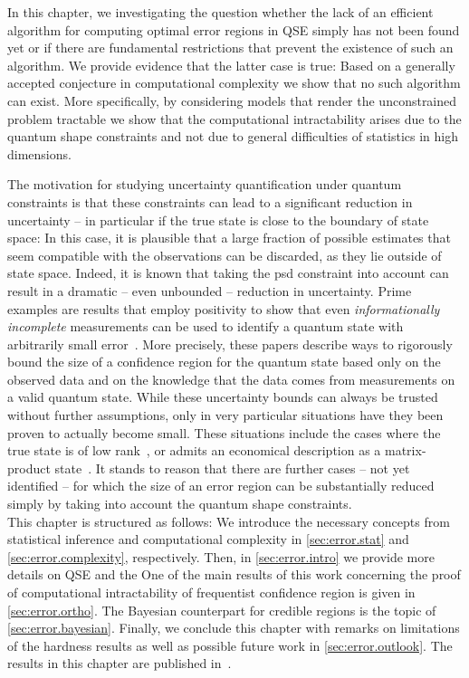 In this chapter, we investigating the question whether the lack of an efficient algorithm for computing optimal error regions in QSE simply has not been found yet or if there are fundamental restrictions that prevent the existence of such an algorithm.
We provide evidence that the latter case is true:
Based on a generally accepted conjecture in computational complexity we show that no such algorithm can exist.
More specifically, by considering models that render the unconstrained problem tractable we show that the computational intractability arises due to the quantum shape constraints and not due to general difficulties of statistics in high dimensions.

The motivation for studying uncertainty quantification under quantum constraints is that these constraints can lead to a significant reduction in uncertainty -- in particular if the true state is close to the boundary of state space:
In this case, it is plausible that a large fraction of possible estimates that seem compatible with the observations can be discarded, as they lie outside of state space.
Indeed, it is known that taking the psd constraint into account can result in a dramatic -- even unbounded -- reduction in uncertainty.
Prime examples are results that employ positivity to show that even \emph{informationally incomplete} measurements can be used to identify a quantum state with arbitrarily small error~\cite{Cramer_2010_Efficient,Gross_2010_Quantum,Gross_2011_Recovering,Flammia_2012_Quantum,Nickl_2013_Confidence,Kalev_2015_Quantum}.
More precisely, these papers describe ways to rigorously bound the size of a confidence region for the quantum state based only on the observed data and on the knowledge that the data comes from measurements on a valid quantum state.
While these uncertainty bounds can always be trusted without further assumptions, only in very particular situations have they been proven to actually become small.
These situations include the cases where the true state is of low rank~\cite{Flammia_2012_Quantum,Nickl_2013_Confidence}, or admits an economical description as a matrix-product state~\cite{Cramer_2010_Efficient}.
It stands to reason that there are further cases -- not yet identified -- for which the size of an error region can be substantially reduced simply by taking into account the quantum shape constraints.\\


This chapter is structured as follows:
We introduce the necessary concepts from statistical inference and computational complexity in \cref{sec:error.stat} and \ref{sec:error.complexity}, respectively.
Then, in \cref{sec:error.intro} we provide more details on QSE and the
One of the main results of this work concerning the proof of computational intractability of frequentist confidence region is given in \cref{sec:error.ortho}.
The Bayesian counterpart for credible regions is the topic of \cref{sec:error.bayesian}.
Finally, we conclude this chapter with remarks on limitations of the hardness results as well as possible future work in \cref{sec:error.outlook}.
The results in this chapter are published in~\cite{Suess_2016_Error}.


